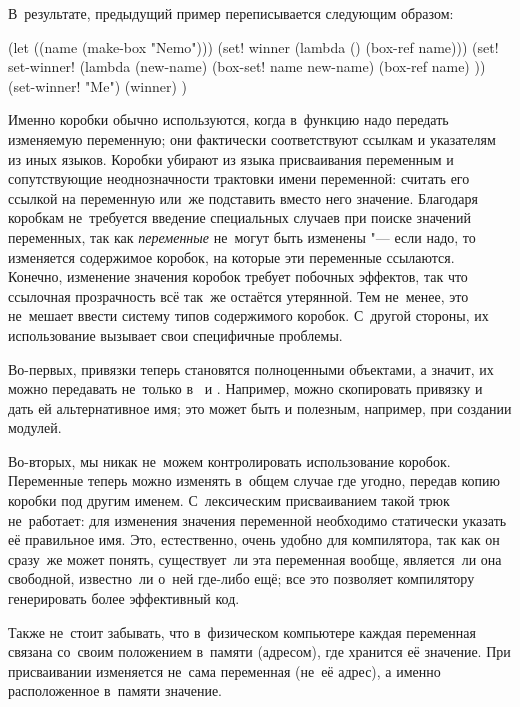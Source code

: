 \noindent
В~результате, предыдущий пример переписывается следующим образом:

\begin{code:lisp}
(let ((name (make-box "Nemo")))
  (set! winner (lambda () (box-ref name)))
  (set! set-winner! (lambda (new-name) (box-set! name new-name)
                                       (box-ref name) ))
  (set-winner! "Me") (winner) )
\end{code:lisp}


Именно коробки обычно используются, когда в~функцию надо передать изменяемую
переменную; они фактически соответствуют ссылкам и указателям из иных языков.
Коробки убирают из языка присваивания переменным и сопутствующие неоднозначности
трактовки имени переменной: считать его ссылкой на переменную или~же подставить
вместо него значение. Благодаря коробкам не~требуется введение специальных
случаев при поиске значений переменных, так как \emph{переменные} не~могут быть
изменены "--- если надо, то изменяется содержимое коробок, на которые эти
переменные ссылаются. Конечно, изменение значения коробок требует побочных
эффектов, так что ссылочная прозрачность всё так~же остаётся утерянной. Тем
не~менее, это не~мешает ввести систему типов содержимого коробок. С~другой
стороны, их использование вызывает свои специфичные проблемы.

Во-первых, привязки теперь становятся полноценными объектами, а значит, их
можно передавать не~только в~ и . Например, можно
скопировать привязку и дать ей альтернативное имя; это может быть и полезным,
например, при создании модулей.

Во-вторых, мы никак не~можем контролировать использование коробок. Переменные
теперь можно изменять в~общем случае где угодно, передав копию коробки под
другим именем. С~лексическим присваиванием такой трюк не~работает: для изменения
значения переменной необходимо статически указать её правильное имя. Это,
естественно, очень удобно для компилятора, так как он сразу~же может понять,
существует~ли эта переменная вообще, является~ли она свободной, известно~ли
о~ней где-либо ещё; все это позволяет компилятору генерировать более эффективный
код.

Также не~стоит забывать, что в~физическом компьютере каждая переменная связана
со~своим положением в~памяти (адресом), где хранится её значение. При
присваивании изменяется не~сама переменная (не~её адрес), а именно расположенное
в~памяти значение.


